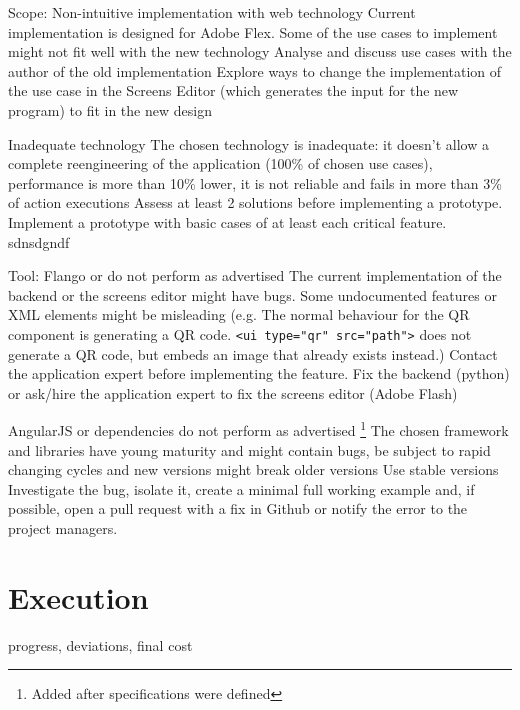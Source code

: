 \begin{risk}
{Scope: Non-intuitive implementation with web technology}
{Current implementation is designed for Adobe Flex. Some of the use cases to implement might not fit well with the new technology}
{Analyse and discuss use cases with the author of the old implementation}
{Explore ways to change the implementation of the use case in the Screens Editor (which generates the input for the new program) to fit in the new design}
\end{risk}

\begin{risk}
{Inadequate technology}
{The chosen technology is inadequate: it doesn't allow a complete reengineering of the application (100\% of chosen use cases), performance is more than 10\% lower, it is not reliable and fails in more than 3\% of action executions}
{Assess at least 2 solutions before implementing a prototype. Implement a prototype with basic cases of at least each critical feature.}
{sdnsdgndf}
\end{risk}

\begin{risk}
{Tool: Flango or \se do not perform as advertised}
{The current implementation of the backend or the screens editor might have bugs.
Some undocumented features or \ac{XML} elements might be misleading (e.g. The normal behaviour for the QR component is generating a QR code. \lstinline$<ui type="qr" src="path">$ does not generate a QR code, but embeds an image that already exists instead.) }
{Contact the application expert before implementing the feature.}
{Fix the backend (python) or ask/hire the application expert to fix the screens editor (Adobe Flash)}
\end{risk}

\begin{risk}
{AngularJS or dependencies do not perform as advertised \footnote{Added after specifications were defined}}
{The chosen framework and libraries have young maturity and might contain bugs, be subject to rapid changing cycles and new versions might break older versions}
{Use stable versions}
{Investigate the bug, isolate it, create a minimal full working example and, if possible, open a pull request with a fix in Github or notify the error to the project managers.}
\end{risk}

\FloatBarrier

\section{Execution}
progress, deviations, final cost

